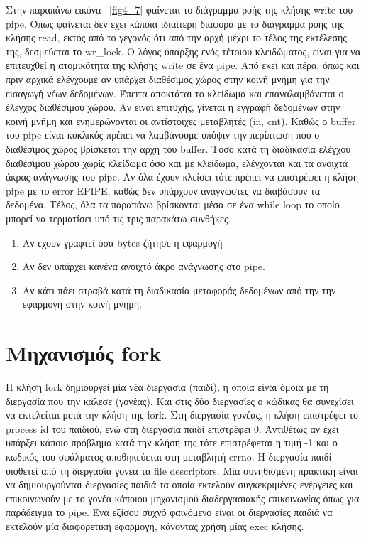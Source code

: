 Στην παραπάνω εικόνα ~\ref{fig4_7} φαίνεται το διάγραμμα ροής της κλήσης write
του pipe. Όπως φαίνεται δεν έχει κάποια ιδιαίτερη διαφορά με το διάγραμμα ροής
της κλήσης read, εκτός από το γεγονός ότι από την αρχή μέχρι το τέλος της
εκτέλεσης της, δεσμεύεται το wr\_lock. Ο λόγος ύπαρξης ενός τέτοιου κλειδώματος,
είναι για να επιτευχθεί η ατομικότητα της κλήσης write σε ένα pipe. Από εκεί και
πέρα, όπως και πριν αρχικά ελέγχουμε αν υπάρχει διαθέσιμος χώρος στην κοινή
μνήμη για την εισαγωγή νέων δεδομένων. Έπειτα αποκτάται το κλείδωμα και
επαναλαμβάνεται ο έλεγχος διαθέσιμου χώρου. Αν είναι επιτυχής, γίνεται η εγγραφή
δεδομένων στην κοινή μνήμη και ενημερώνονται οι αντίστοιχες μεταβλητές (in,
cnt). Καθώς ο buffer του pipe είναι κυκλικός πρέπει να λαμβάνουμε υπόψιν την
περίπτωση που ο διαθέσιμος χώρος βρίσκεται την αρχή του buffer. Τόσο κατά τη
διαδικασία ελέγχου διαθέσιμου χώρου χωρίς κλείδωμα όσο και με κλείδωμα,
ελέγχονται και τα ανοιχτά άκρας ανάγνωσης του pipe. Αν όλα έχουν κλείσει τότε
πρέπει να επιστρέψει η κλήση pipe με το error EPIPE, καθώς δεν υπάρχουν
αναγνώστες να διαβάσουν τα δεδομένα. Τέλος, όλα τα παραπάνω βρίσκονται μέσα σε
ένα while loop το οποίο μπορεί να τερματίσει υπό τις τρις παρακάτω συνθήκες.
\begin{enumerate}
	\item Αν έχουν γραφτεί όσα bytes ζήτησε η εφαρμογή
	\item Αν δεν υπάρχει κανένα ανοιχτό άκρο ανάγνωσης στο pipe.
	\item Αν κάτι πάει στραβά κατά τη διαδικασία μεταφοράς δεδομένων από την
		την εφαρμογή στην κοινή μνήμη.
\end{enumerate}

\newpage
\section{Μηχανισμός fork}

Η κλήση fork δημιουργεί μία νέα διεργασία (παιδί), η οποία είναι όμοια με τη
διεργασία που την κάλεσε (γονέας). Και στις δύο διεργασίες ο κώδικας θα
συνεχίσει να εκτελείται μετά την κλήση της fork. Στη διεργασία γονέας, η κλήση
επιστρέφει το process id του παιδιού, ενώ στη διεργασία παιδί επιστρέφει 0.
Αντιθέτως αν έχει υπάρξει κάποιο πρόβλημα κατά την κλήση της τότε επιστρέφεται η
τιμή -1 και ο κωδικός του σφάλματος αποθηκεύεται στη μεταβλητή errno. Η
διεργασία παιδί υιοθετεί από τη διεργασία γονέα τα file descriptors. Μία
συνηθισμένη πρακτική είναι να δημιουργούνται διεργασίες παιδιά τα οποία εκτελούν
συγκεκριμένες ενέργειες και επικοινωνούν με το γονέα κάποιου μηχανισμού
διαδεργασιακής επικοινωνίας όπως για παράδειγμα το pipe. Ένα εξίσου συχνό
φαινόμενο είναι οι διεργασίες παιδιά να εκτελούν μία διαφορετική εφαρμογή,
κάνοντας χρήση μίας exec κλήσης. 

